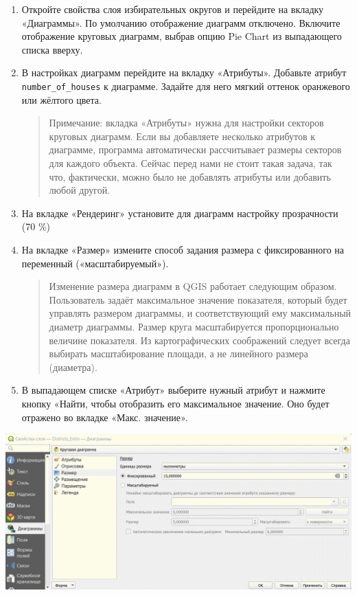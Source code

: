 \documentclass[
  12pt,
]{book}
\begin{document}
\begin{enumerate}
\def\labelenumi{\arabic{enumi}.}
\item
  Откройте свойства слоя избирательных округов и перейдите на вкладку «Диаграммы». По умолчанию отображение диаграмм отключено. Включите отображение круговых диаграмм, выбрав опцию Pie Chart из выпадающего списка вверху.
\item
  В настройках диаграмм перейдите на вкладку «Атрибуты». Добавьте атрибут \texttt{number\_of\_houses} к диаграмме. Задайте для него мягкий оттенок оранжевого или жёлтого цвета.

  \begin{quote}
  Примечание: вкладка «Атрибуты» нужна для настройки секторов круговых диаграмм. Если вы добавляете несколько атрибутов к диаграмме, программа автоматически рассчитывает размеры секторов для каждого объекта. Сейчас перед нами не стоит такая задача, так что, фактически, можно было не добавлять атрибуты или добавить любой другой.
  \end{quote}
\item
  На вкладке «Рендеринг» установите для диаграмм настройку прозрачности (70 \%)
\item
  На вкладке «Размер» измените способ задания размера с фиксированного на переменный («масштабируемый»).

  \begin{quote}
  Изменение размера диаграмм в QGIS работает следующим образом. Пользователь задаёт максимальное значение показателя, который будет управлять размером диаграммы, и соответствующий ему максимальный диаметр диаграммы. Размер круга масштабируется пропорционально величине показателя. Из картографических соображений следует всегда выбирать масштабирование площади, а не линейного размера (диаметра).
  \end{quote}
\item
  В выпадающем списке «Атрибут» выберите нужный атрибут и нажмите кнопку «Найти, чтобы отобразить его максимальное значение. Оно будет отражено во вкладке «Макс. значение».
\end{enumerate}

\includegraphics{images/Ex05_Vectorization/diagrams1.gif}
\end{document}
